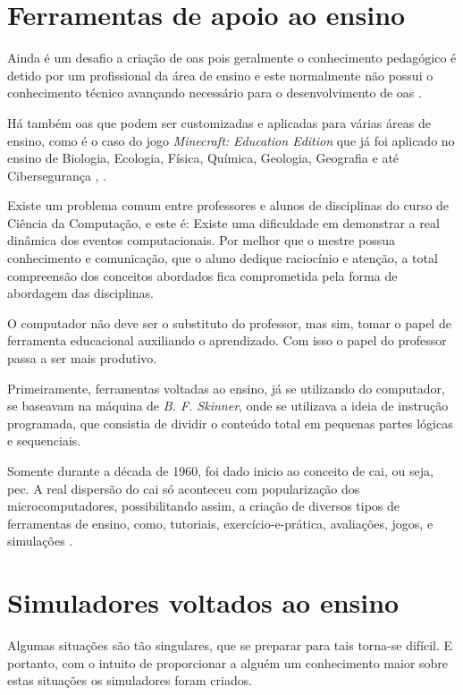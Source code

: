 \section{Ferramentas de apoio ao ensino}
\label{sec:ferramentaspoioensino}

Ainda é um desafio a criação de \acrshort{oa}s pois geralmente o conhecimento pedagógico é detido por um profissional da área de ensino e este normalmente não possui o conhecimento técnico avançando necessário para o desenvolvimento de \acrshort{oa}s \cite{braga15}.

Há também \acrshort{oa}s que podem ser customizadas e aplicadas para várias áreas de ensino, como é o caso do jogo \textit{Minecraft: Education Edition} que já foi aplicado no ensino de Biologia, Ecologia, Física, Química, Geologia, Geografia \cite{short12} e até Cibersegurança \cite{geary19}, .

Existe um problema comum entre professores e alunos de disciplinas do curso de Ciência da Computação, e este é: Existe uma dificuldade em demonstrar a real dinâmica dos eventos computacionais. Por melhor que o mestre possua conhecimento e comunicação, que o aluno dedique raciocínio e atenção, a total compreensão dos conceitos abordados fica comprometida pela forma de abordagem das disciplinas.

O computador não deve ser o substituto do professor, mas sim, tomar o papel de ferramenta educacional auxiliando o aprendizado. Com isso o papel do professor passa a ser mais produtivo.

Primeiramente, ferramentas voltadas ao ensino, já se utilizando do computador, se baseavam na máquina de \textit{B. F. Skinner}, onde se utilizava a ideia de instrução programada, que consistia de dividir o conteúdo total em pequenas partes lógicas e sequenciais.

Somente durante a década de 1960, foi dado inicio ao conceito de \acrfull{cai}, ou seja, \acrfull{pec}. A real dispersão do \acrshort{cai} só aconteceu com popularização dos microcomputadores, possibilitando assim, a criação de diversos tipos de ferramentas de ensino, como, tutoriais, exercício-e-prática, avaliações, jogos, e simulações \cite{hamawaki09}.

\section{Simuladores voltados ao ensino}
\label{sec:simuladoresvoltadosensino}

Algumas situações são tão singulares, que se preparar para tais torna-se difícil. E portanto, com o intuito de proporcionar a alguém um conhecimento maior sobre estas situações os simuladores foram criados.


